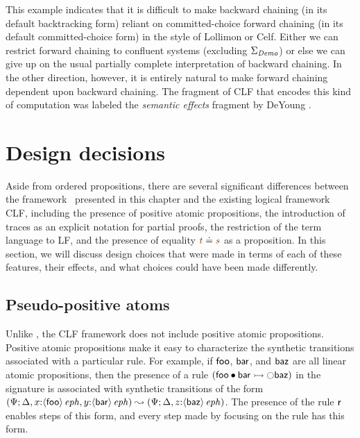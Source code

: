 This example indicates that it is difficult to make backward chaining
(in its default backtracking form) reliant on committed-choice forward
chaining (in its default committed-choice form) in the style of
Lollimon or Celf. Either we can restrict forward chaining to confluent
systems (excluding $\Sigma_{\it Demo}$) or else we can give up on the
usual partially complete interpretation of backward chaining.  In the
other direction, however, it is entirely natural to make forward
chaining dependent upon backward chaining. The fragment of CLF that
encodes this kind of computation was labeled the {\it semantic effects}
fragment by DeYoung \cite{deyoung09reasoning}.

\section{Design decisions}
\label{sec:designdecisions}

Aside from ordered propositions, there are several significant
differences between the framework \sls~presented in this chapter and
the existing logical framework CLF, including the presence of positive
atomic propositions, the introduction of traces as an explicit
notation for partial proofs, the restriction of the term language to
LF, and the presence of equality $\lf{t} \doteq \lf{s}$ as a
proposition. In this section, we will discuss design choices that were
made in terms of each of these features, their effects, and what
choices could have been made differently.

\subsection{Pseudo-positive atoms}
\label{sec:pseudopositive}

Unlike \sls, the CLF framework does not include positive
atomic propositions. Positive atomic propositions make it easy to
characterize the synthetic transitions associated with a particular
rule. For example, if ${\sf foo}$, ${\sf bar}$, and ${\sf baz}$ are
all linear atomic propositions, then the presence of a rule $\left({\sf foo}
\mathbin{\bullet} {\sf bar} \rightarrowtail {\ocircle}{\sf baz}\right)$ in the signature is associated
with synthetic transitions of the form
%
$(\Psi; {\Delta},{{x{:}{\langle {\sf
        foo} \rangle}\,{{\it eph}}},{y{:}{\langle {\sf bar} \rangle}\,{{\it eph}}}})
 \leadsto
 (\Psi; {\Delta},{z{:}{\langle {\sf baz} \rangle}\,{{\it eph}}})$.
%
The presence of the
rule $\sf r$ enables steps of this form, and every step made by
focusing on the rule has this form.

